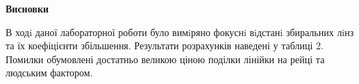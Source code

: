 \begin{center}
    \Large{\textbf{Висновки}}    
\end{center}

\vspace{1mm}

В ходi даної лабораторної роботи було вимiряно фокуснi 
вiдстанi збиральних лiнз та їх коефіцієнти збільшення.
Результати розрахунків наведені у таблиці 2.
Помилки обумовлені достатньо великою ціною поділки лінійки на рейці та
людським фактором.